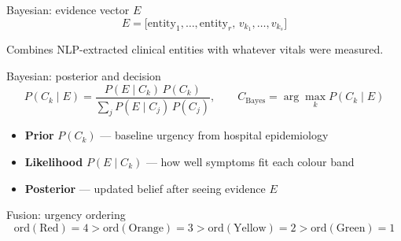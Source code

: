 \begin{frame}{Bayesian: evidence vector $E$}
  \begin{equation*}
    E = \bigl[\text{entity}_1, \ldots, \text{entity}_r,\, v_{k_1}, \ldots, v_{k_s}\bigr]
  \end{equation*}

  Combines NLP-extracted clinical entities with whatever vitals were measured.

\end{frame}

\begin{frame}{Bayesian: posterior and decision}
  \begin{equation*}
    P(C_k \mid E) = \frac{P(E \mid C_k)\, P(C_k)}{\sum_{j} P(E \mid C_j)\, P(C_j)},
    \qquad
    C_{\mathrm{Bayes}} = \arg\max_{k} P(C_k \mid E)
  \end{equation*}

  \begin{itemize}
    \item \textbf{Prior} $P(C_k)$ --- baseline urgency from hospital epidemiology
    \item \textbf{Likelihood} $P(E \mid C_k)$ --- how well symptoms fit each colour band
    \item \textbf{Posterior} --- updated belief after seeing evidence $E$
  \end{itemize}

\end{frame}

\begin{frame}{Fusion: urgency ordering}
  \begin{equation*}
    \mathrm{ord}(\text{Red}) = 4 > \mathrm{ord}(\text{Orange}) = 3 >
    \mathrm{ord}(\text{Yellow}) = 2 > \mathrm{ord}(\text{Green}) = 1
  \end{equation*}

\end{frame}

